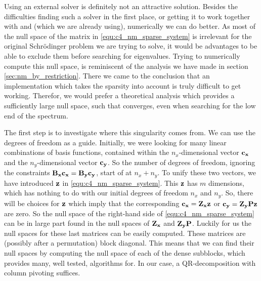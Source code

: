 Using an external solver is definitely not an attractive solution. Besides the difficulties finding such a solver in the first place, or getting it to work together with \slepc and \Eigen (which we are already using), numerically we can do better. As most of the null space of the matrix in \eqref{equ:c4_nm_sparse_system} is irrelevant for the original Schrödinger problem we are trying to solve, it would be advantages to be able to exclude them before searching for eigenvalues. Trying to numerically compute this null space, is reminiscent of the analysis we have made in section \ref{sec:nm_by_restriction}. There we came to the conclusion that an implementation which takes the sparsity into account is truly difficult to get working. Therefor, we would prefer a theoretical analysis which provides a sufficiently large null space, such that \slepc converges, even when searching for the low end of the spectrum.

The first step is to investigate where this singularity comes from. We can use the degrees of freedom as a guide. Initially, we were looking for many linear combinations of basis functions, contained within the $n_x$-dimensional vector $\vb{c_x}$ and the $n_y$-dimensional vector $\vb{c_y}$. So the number of degrees of freedom, ignoring the constraints $\vb{B_x}\vb{c_x} = \vb{B_y}\vb{c_y}$, start of at $n_x + n_y$. To unify these two vectors, we have introduced $\vb{z}$ in \eqref{equ:c4_nm_sparse_system}. This $\vb{z}$ has $m$ dimensions, which has nothing to do with our initial degrees of freedom $n_x$ and $n_y$. So, there will be choices for $\vb{z}$ which imply that the corresponding $\vb{c_x} = \vb{Z_x} \vb{z}$
or $\vb{c_y} = \vb{Z_y} \vb{P} \vb{z}$ are zero. So the null space of the right-hand side of \eqref{equ:c4_nm_sparse_system} can be in large part found in the null spaces of $\vb{Z_x}$ and $\vb{Z_y} \vb{P}$. Luckily for us the null spaces for these last matrices can be easily computed. These matrices are (possibly after a permutation) block diagonal. This means that we can find their null spaces by computing the null space of each of the dense subblocks, which \Eigen provides many, well tested, algorithms for. In our case, a QR-decomposition with column pivoting suffices.

